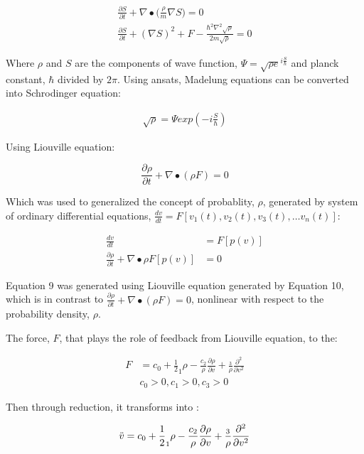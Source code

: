 \documentclass[12pt]{article}
\begin{document}
\begin{align}
	\frac{\partial S}{\partial t} + \nabla \bullet \Big ( \frac{\rho}{m} \nabla S \Big ) = 0 \label{s1} \\
	\frac{\partial S}{\partial t} + (\nabla S)^2 + F - \frac{\hbar^2 \nabla^2 \sqrt{\rho}}{2m \sqrt{\rho}} = 0 \label{s2}
\end{align}

Where $\rho$ and $S$ are the components of wave function, $\Psi = \sqrt{\rho e}^{i\frac{S}{\hbar}}$ and planck constant, $\hbar$ divided by $2\pi$. Using ansats, Madelung equations can be converted into Schrodinger equation:

\begin{align*}
	\sqrt{\rho} = \Psi exp(-i \frac{S}{\hbar})
\end{align*}

Using Liouville equation:

\begin{equation}
	\frac{\partial \rho}{\partial t} + \nabla \bullet (\rho F) = 0
\end{equation}

Which was used to generalized the concept of probablity, $\rho$, generated by system of ordinary differential equations, $\frac{dv}{dt} = F[v_1 (t), v_2(t), v_3(t), \dots v_n (t)]$:

\begin{align}
	\frac{dv}{dt} &= F[p(v)] \label{s3} \\
	\frac{\partial \rho}{\partial t} + \nabla \bullet {\rho F[p(v)]} &= 0 \label{s4}
\end{align}

Equation 9 was generated using Liouville equation generated by Equation 10, which is in contrast to  $\frac{\partial \rho}{\partial t} + \nabla \bullet (\rho F) = 0$, nonlinear with respect to the probability density, $\rho$.

The force, $F$, that plays the role of feedback from Liouville equation, to the:

\begin{align}
	F &= c_0 + \frac{1}{2}_1 \rho - \frac{c_2}{\rho} \frac{\partial \rho}{\partial v} + \frac{_3}{\rho} \frac{\partial ^2}{\partial v^2} \label{s5} \\
	& c_0 > 0, c_1 > 0, c_3 > 0 \nonumber
\end{align}

Then through reduction, it transforms into :

\begin{equation}
	\ddot{v} = c_0 + \frac{1}{2}_1 \rho - \frac{c_2}{\rho} \frac{\partial \rho}{\partial v} + \frac{_3}{\rho} \frac{\partial ^2}{\partial v^2} \label{f} \\
\end{equation}
\end{document}
